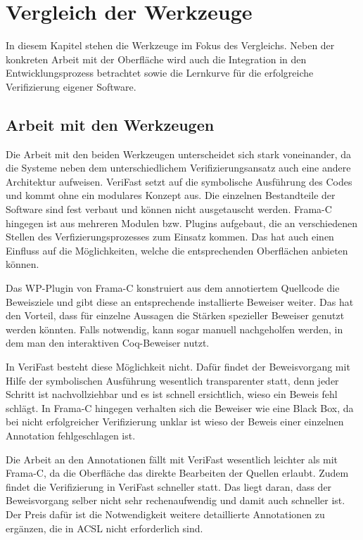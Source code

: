 ﻿\chapter{Vergleich der Werkzeuge}

In diesem Kapitel stehen die Werkzeuge im Fokus des Vergleichs. Neben der konkreten Arbeit mit der
Oberfläche wird auch die Integration in den Entwicklungsprozess betrachtet sowie die Lernkurve für
die erfolgreiche Verifizierung eigener Software.

\section{Arbeit mit den Werkzeugen}

Die Arbeit mit den beiden Werkzeugen unterscheidet sich stark voneinander, da die Systeme
neben dem unterschiedlichem Verifizierungsansatz auch eine andere Architektur aufweisen.
VeriFast setzt auf die symbolische Ausführung des Codes und kommt ohne ein modulares Konzept aus.
Die einzelnen Bestandteile der Software sind fest verbaut und können nicht ausgetauscht werden.
Frama-C hingegen ist aus mehreren Modulen bzw. Plugins aufgebaut, die an verschiedenen Stellen des
Verfizierungsprozesses zum Einsatz kommen. Das hat auch einen Einfluss auf die Möglichkeiten, welche
die entsprechenden Oberflächen anbieten können.

Das WP-Plugin von Frama-C konstruiert aus dem annotiertem Quellcode die Beweisziele und gibt diese an 
entsprechende installierte Beweiser weiter. Das hat den Vorteil, dass für einzelne Aussagen die Stärken
spezieller Beweiser genutzt werden könnten. Falls notwendig, kann sogar manuell nachgeholfen werden, in
dem man den interaktiven Coq-Beweiser nutzt.

In VeriFast besteht diese Möglichkeit nicht. Dafür findet der Beweisvorgang mit Hilfe der symbolischen
Ausführung wesentlich transparenter statt, denn jeder Schritt ist nachvollziehbar und es ist schnell ersichtlich,
wieso ein Beweis fehl schlägt. In Frama-C hingegen verhalten sich die Beweiser wie eine Black Box, da
bei nicht erfolgreicher Verifizierung unklar ist wieso der Beweis einer einzelnen Annotation
fehlgeschlagen ist.

Die Arbeit an den Annotationen fällt mit VeriFast wesentlich leichter als mit Frama-C, da die
Oberfläche das direkte Bearbeiten der Quellen erlaubt. Zudem findet die Verifizierung in VeriFast
schneller statt. Das liegt daran, dass der Beweisvorgang selber nicht sehr rechenaufwendig und damit auch schneller\cite[Kap. 3]{jac10-1}
ist. Der Preis dafür ist die Notwendigkeit weitere detaillierte Annotationen zu ergänzen, die in ACSL nicht erforderlich
sind.


